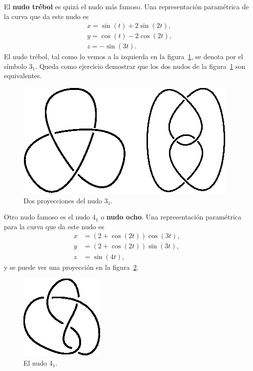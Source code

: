 \documentclass[graybox]{svmult}
\begin{document}
\begin{example}
    El \textbf{nudo trébol} es quizá el nudo más famoso. Una representación
    paramétrica de la curva que da este nudo es 
    \begin{align*}
        &x=\sin(t)+2\sin(2t),\\
        &y=\cos(t)-2\cos(2t),\\
        &z=-\sin(3t).
    \end{align*}
	El nudo trébol, tal como lo vemos a la izquierda en la
	figura~\ref{fig:trefoil}, se denota por el símbolo $3_1$.  Queda como
	ejercicio demostrar que los dos nudos de la figura~\ref{fig:trefoil} son
	equivalentes.
\end{example}

\begin{example}
	\begin{figure}[ht]
		\centering
		\includegraphics[scale=0.6]{images/trefoils}
		\caption{Dos proyecciones del nudo $3_1$.}
		\label{fig:trefoil}
	\end{figure}

    Otro nudo famoso es el nudo $4_1$ o \textbf{nudo ocho}. Una
    representación paramétrica para la curva que da este nudo es
	\begin{align*}
		x&=(2+\cos(2t))\cos(3t),\\
		y&=(2+\cos(2t))\sin(3t),\\
		z&=\sin(4t),
	\end{align*}
	y se puede ver una proyección en la figura~\ref{fig:4_1:unoriented}.
	\begin{figure}[ht]
		\centering
		\includegraphics[scale=0.7]{images/4_1unoriented}
		\caption{El nudo $4_1$.}
		\label{fig:4_1:unoriented}
	\end{figure}
\end{example}
\end{document}
